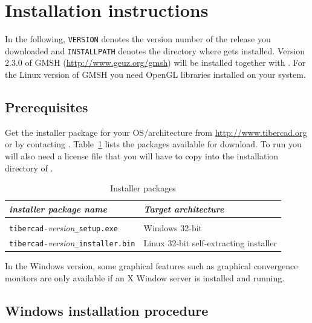 \chapter*{Installation instructions}

\newcommand{\GMSHver}{2.3.0}
\newcommand{\instpath}{\texttt{INSTALLPATH}}
\newcommand{\version}{\texttt{VERSION}}

In the following, \version{} denotes the version number of the \TiberCAD{} release
you downloaded and \instpath{} denotes the directory where \TiberCAD{} gets installed.
Version \GMSHver{} of GMSH (\url{http://www.geuz.org/gmsh}) will be installed together with
\TiberCAD. For the Linux version of GMSH you need OpenGL libraries installed on your system.

\section*{Prerequisites}

Get the installer package for your OS/architecture from \url{http://www.tibercad.org}
or by contacting .
Table~\ref{install:table:packages} lists the packages available for download.
To run \TiberCAD{} you will also need a license file that you will have to copy into
the installation directory of \TiberCAD.
\begin{table}
\begin{tabular}{l|p{8cm}}
\emph{installer package name} & \emph{Target architecture} \\
\hline  \\
\verb+tibercad-+\textsl{version}\verb+_setup.exe+ & Windows 32-bit \\
\verb+tibercad-+\textsl{version}\verb+_installer.bin+ & Linux 32-bit self-extracting installer
\end{tabular}
\caption{Installer packages}
\label{install:table:packages}
\end{table}

In the Windows version, some graphical features such as graphical convergence monitors are only
available if an X Window server is installed and running.




\section*{Windows installation procedure}

